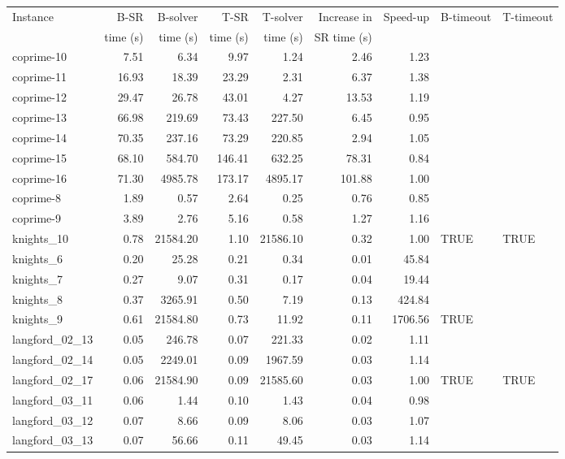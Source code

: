 \documentclass[runningheads]{llncs}
\begin{document}
\begin{table}[ht]
\centering
\begin{tabular}{lrrrrrrll}
  \hline
Instance & B-SR     & B-solver & T-SR      & T-solver  & Increase in & Speed-up & B-timeout & T-timeout \\
         & time (s) & time (s) & time (s)  & time (s)  & SR time (s)  & & & \\    
  \hline
coprime-10 & 7.51 & 6.34 & 9.97 & 1.24 & 2.46 & 1.23 &   &   \\ 
coprime-11 & 16.93 & 18.39 & 23.29 & 2.31 & 6.37 & 1.38 &   &   \\ 
coprime-12 & 29.47 & 26.78 & 43.01 & 4.27 & 13.53 & 1.19 &   &   \\ 
coprime-13 & 66.98 & 219.69 & 73.43 & 227.50 & 6.45 & 0.95 &   &   \\ 
coprime-14 & 70.35 & 237.16 & 73.29 & 220.85 & 2.94 & 1.05 &   &   \\ 
coprime-15 & 68.10 & 584.70 & 146.41 & 632.25 & 78.31 & 0.84 &   &   \\ 
coprime-16 & 71.30 & 4985.78 & 173.17 & 4895.17 & 101.88 & 1.00 &   &   \\ 
coprime-8 & 1.89 & 0.57 & 2.64 & 0.25 & 0.76 & 0.85 &   &   \\ 
coprime-9 & 3.89 & 2.76 & 5.16 & 0.58 & 1.27 & 1.16 &   &   \\ 
 knights\_10 & 0.78 & 21584.20 & 1.10 & 21586.10 & 0.32 & 1.00 & TRUE & TRUE \\ 
 knights\_6 & 0.20 & 25.28 & 0.21 & 0.34 & 0.01 & 45.84 &   &   \\ 
 knights\_7 & 0.27 & 9.07 & 0.31 & 0.17 & 0.04 & 19.44 &   &   \\ 
 knights\_8 & 0.37 & 3265.91 & 0.50 & 7.19 & 0.13 & 424.84 &   &   \\ 
 knights\_9 & 0.61 & 21584.80 & 0.73 & 11.92 & 0.11 & 1706.56 & TRUE &   \\ 
 langford\_02\_13 & 0.05 & 246.78 & 0.07 & 221.33 & 0.02 & 1.11 &   &   \\ 
 langford\_02\_14 & 0.05 & 2249.01 & 0.09 & 1967.59 & 0.03 & 1.14 &   &   \\ 
 langford\_02\_17 & 0.06 & 21584.90 & 0.09 & 21585.60 & 0.03 & 1.00 & TRUE & TRUE \\ 
 langford\_03\_11 & 0.06 & 1.44 & 0.10 & 1.43 & 0.04 & 0.98 &   &   \\ 
 langford\_03\_12 & 0.07 & 8.66 & 0.09 & 8.06 & 0.03 & 1.07 &   &   \\ 
 langford\_03\_13 & 0.07 & 56.66 & 0.11 & 49.45 & 0.03 & 1.14 &   &   \\ 

\end{tabular}
\end{table}
\end{document}
